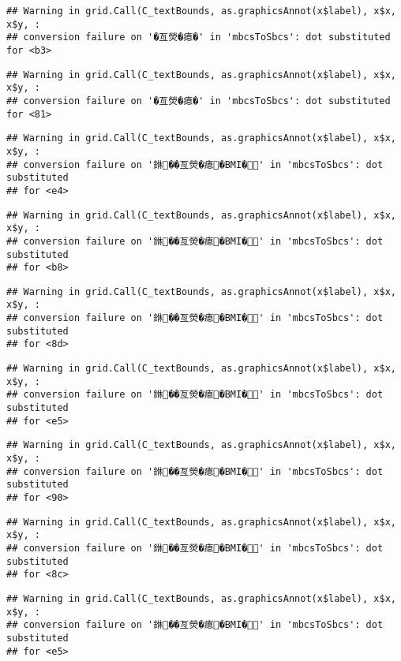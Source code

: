 \documentclass[
]{article}
\begin{document}
\begin{verbatim}
## Warning in grid.Call(C_textBounds, as.graphicsAnnot(x$label), x$x, x$y, :
## conversion failure on '�亙熒�瘜�' in 'mbcsToSbcs': dot substituted for <b3>
\end{verbatim}

\begin{verbatim}
## Warning in grid.Call(C_textBounds, as.graphicsAnnot(x$label), x$x, x$y, :
## conversion failure on '�亙熒�瘜�' in 'mbcsToSbcs': dot substituted for <81>
\end{verbatim}

\begin{verbatim}
## Warning in grid.Call(C_textBounds, as.graphicsAnnot(x$label), x$x, x$y, :
## conversion failure on '銝��亙熒�瘜�BMI�' in 'mbcsToSbcs': dot substituted
## for <e4>
\end{verbatim}

\begin{verbatim}
## Warning in grid.Call(C_textBounds, as.graphicsAnnot(x$label), x$x, x$y, :
## conversion failure on '銝��亙熒�瘜�BMI�' in 'mbcsToSbcs': dot substituted
## for <b8>
\end{verbatim}

\begin{verbatim}
## Warning in grid.Call(C_textBounds, as.graphicsAnnot(x$label), x$x, x$y, :
## conversion failure on '銝��亙熒�瘜�BMI�' in 'mbcsToSbcs': dot substituted
## for <8d>
\end{verbatim}

\begin{verbatim}
## Warning in grid.Call(C_textBounds, as.graphicsAnnot(x$label), x$x, x$y, :
## conversion failure on '銝��亙熒�瘜�BMI�' in 'mbcsToSbcs': dot substituted
## for <e5>
\end{verbatim}

\begin{verbatim}
## Warning in grid.Call(C_textBounds, as.graphicsAnnot(x$label), x$x, x$y, :
## conversion failure on '銝��亙熒�瘜�BMI�' in 'mbcsToSbcs': dot substituted
## for <90>
\end{verbatim}

\begin{verbatim}
## Warning in grid.Call(C_textBounds, as.graphicsAnnot(x$label), x$x, x$y, :
## conversion failure on '銝��亙熒�瘜�BMI�' in 'mbcsToSbcs': dot substituted
## for <8c>
\end{verbatim}

\begin{verbatim}
## Warning in grid.Call(C_textBounds, as.graphicsAnnot(x$label), x$x, x$y, :
## conversion failure on '銝��亙熒�瘜�BMI�' in 'mbcsToSbcs': dot substituted
## for <e5>
\end{verbatim}
\end{document}
